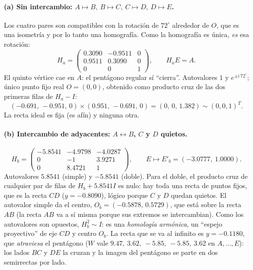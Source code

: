 \paragraph{(a) Sin intercambio: \(A\mapsto B,\ B\mapsto C,\ C\mapsto D,\ D\mapsto E\).}
Los cuatro pares son compatibles con la rotación de \(72^\circ\) alrededor de \(O\), que es
una isometría y por lo tanto una homografía. Como la homografía es única, \emph{es} esa
rotación:
\[
  H_a=\begin{pmatrix}0.3090&-0.9511&0\\0.9511&0.3090&0\\0&0&1\end{pmatrix},
  \qquad H_aE=A .
\]
El quinto vértice cae en \(A\): el pentágono regular sí ``cierra''. Autovalores \(1\) y
\(e^{\pm i\,72^\circ}\); único punto fijo real \(O=(0,0)\), obtenido como producto cruz de
las dos primeras filas de \(H_a-I\):
\[
  (-0.691,\,-0.951,\,0)\times(0.951,\,-0.691,\,0)=(0,\,0,\,1.382)\sim(0,0,1)^T .
\]
La recta ideal es fija (es afín) y ninguna otra.

\paragraph{(b) Intercambio de adyacentes: \(A\leftrightarrow B\), \(C\) y \(D\) quietos.}
\[
  H_b=\begin{pmatrix}-5.8541&-4.9798&-4.0287\\0&-1&3.9271\\0&8.4721&1\end{pmatrix},
  \qquad E\mapsto E'_b=(-3.0777,\ 1.0000).
\]
Autovalores \(5.8541\) (simple) y \(-5.8541\) (doble). Para el doble, el producto cruz de
cualquier par de filas de \(H_b+5.8541I\) es nulo: hay toda una recta de puntos fijos, que es
la recta \(CD\) (\(y=-0.8090\)), lógico porque \(C\) y \(D\) quedan quietos. El autovalor
simple da el centro, \(O_b=(-0.5878,\,0.5729)\), que está sobre la recta \(AB\) (la recta
\(AB\) va a sí misma porque sus extremos se intercambian). Como los autovalores son
opuestos, \(H_b^2\sim I\): es una \emph{homología armónica}, un ``espejo proyectivo'' de eje
\(CD\) y centro \(O_b\). La recta que se va al infinito es \(y=-0.1180\), que
\emph{atraviesa} el pentágono (\(W\) vale \(9.47,\ 3.62,\ -5.85,\ -5.85,\ 3.62\) en
\(A,\dots,E\)): los lados \(BC\) y \(DE\) la cruzan y la imagen del pentágono se parte en
dos semirrectas por lado.

